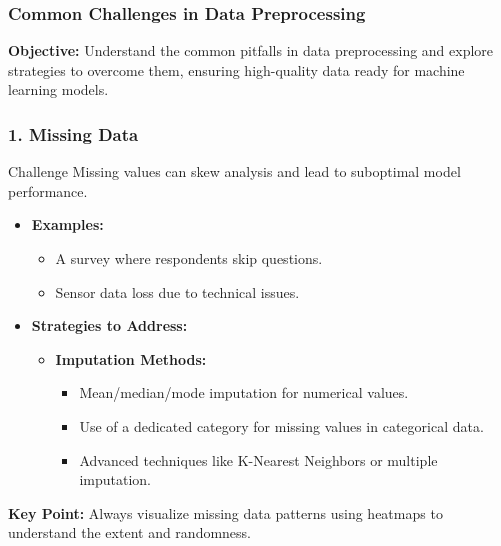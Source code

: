 \documentclass[aspectratio=169]{beamer}
\begin{document}
\begin{frame}[fragile]
  \frametitle{Common Challenges in Data Preprocessing}
  \textbf{Objective:} Understand the common pitfalls in data preprocessing and explore strategies to overcome them, ensuring high-quality data ready for machine learning models.
\end{frame}

\begin{frame}[fragile]
  \frametitle{1. Missing Data}
  \begin{block}{Challenge}
    Missing values can skew analysis and lead to suboptimal model performance.
  \end{block}
  
  \begin{itemize}
    \item \textbf{Examples:}
      \begin{itemize}
        \item A survey where respondents skip questions.
        \item Sensor data loss due to technical issues.
      \end{itemize}
    
    \item \textbf{Strategies to Address:}
      \begin{itemize}
        \item \textbf{Imputation Methods:}
        \begin{itemize}
          \item Mean/median/mode imputation for numerical values.
          \item Use of a dedicated category for missing values in categorical data.
          \item Advanced techniques like K-Nearest Neighbors or multiple imputation.
        \end{itemize}
      \end{itemize}
  \end{itemize}
  
  \textbf{Key Point:} Always visualize missing data patterns using heatmaps to understand the extent and randomness.
\end{frame}
\end{document}
